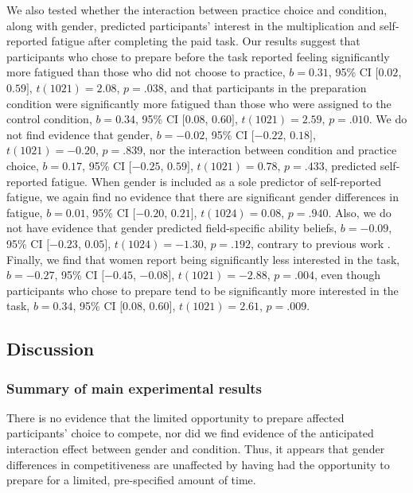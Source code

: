 \documentclass[letterpaper, nobind]{templates/ociamthesis}
\begin{document}
We also tested whether the interaction between practice choice and condition, along with gender, predicted participants' interest in the multiplication and self-reported fatigue after completing the paid task. Our results suggest that participants who chose to prepare before the task reported feeling significantly more fatigued than those who did not choose to practice, \(b = 0.31\), 95\% CI \([0.02\), \(0.59]\), \(t(1021) = 2.08\), \(p = .038\), and that participants in the preparation condition were significantly more fatigued than those who were assigned to the control condition, \(b = 0.34\), 95\% CI \([0.08\), \(0.60]\), \(t(1021) = 2.59\), \(p = .010\). We do not find evidence that gender, \(b = -0.02\), 95\% CI \([-0.22\), \(0.18]\), \(t(1021) = -0.20\), \(p = .839\), nor the interaction between condition and practice choice, \(b = 0.17\), 95\% CI \([-0.25\), \(0.59]\), \(t(1021) = 0.78\), \(p = .433\), predicted self-reported fatigue. When gender is included as a sole predictor of self-reported fatigue, we again find no evidence that there are significant gender differences in fatigue, \(b = 0.01\), 95\% CI \([-0.20\), \(0.21]\), \(t(1024) = 0.08\), \(p = .940\). Also, we do not have evidence that gender predicted field-specific ability beliefs, \(b = -0.09\), 95\% CI \([-0.23\), \(0.05]\), \(t(1024) = -1.30\), \(p = .192\), contrary to previous work \autocite{Leslie2015}. Finally, we find that women report being significantly less interested in the task, \(b = -0.27\), 95\% CI \([-0.45\), \(-0.08]\), \(t(1021) = -2.88\), \(p = .004\), even though participants who chose to prepare tend to be significantly more interested in the task, \(b = 0.34\), 95\% CI \([0.08\), \(0.60]\), \(t(1021) = 2.61\), \(p = .009\).

\hypertarget{discussion-1}{%
\subsection{Discussion}\label{discussion-1}}

\hypertarget{summary-of-main-experimental-results-1}{%
\subsubsection{Summary of main experimental results}\label{summary-of-main-experimental-results-1}}

There is no evidence that the limited opportunity to prepare affected participants' choice to compete, nor did we find evidence of the anticipated interaction effect between gender and condition. Thus, it appears that gender differences in competitiveness are unaffected by having had the opportunity to prepare for a limited, pre-specified amount of time.
\end{document}
